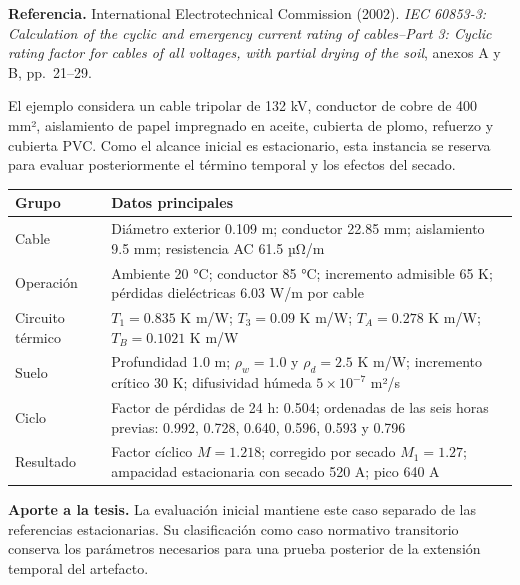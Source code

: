 \documentclass[11pt,a4paper,oneside]{report}
\newcounter{none}
\begin{document}
\textbf{Referencia.} International Electrotechnical Commission (2002).
\emph{IEC 60853-3: Calculation of the cyclic and emergency current
rating of cables--Part 3: Cyclic rating factor for cables of all
voltages, with partial drying of the soil}, anexos A y B, pp.~21--29.

El ejemplo considera un cable tripolar de 132 kV, conductor de cobre de
400 mm², aislamiento de papel impregnado en aceite, cubierta de plomo,
refuerzo y cubierta PVC. Como el alcance inicial es estacionario, esta
instancia se reserva para evaluar posteriormente el término temporal y
los efectos del secado.

{\def\LTcaptype{none} %
\begin{longtable}[]{@{}
  >{\raggedright\arraybackslash}p{}
  >{\raggedright\arraybackslash}p{}@{}}
\toprule\noalign{}
\begin{minipage}[b]{\linewidth}\raggedright
Grupo
\end{minipage} & \begin{minipage}[b]{\linewidth}\raggedright
Datos principales
\end{minipage} \\
\midrule\noalign{}
\endhead
\bottomrule\noalign{}
\endlastfoot
Cable & Diámetro exterior 0.109 m; conductor 22.85 mm; aislamiento 9.5
mm; resistencia AC 61.5 µΩ/m \\
Operación & Ambiente 20 °C; conductor 85 °C; incremento admisible 65 K;
pérdidas dieléctricas 6.03 W/m por cable \\
Circuito térmico & \(T_1=0.835\) K m/W; \(T_3=0.09\) K m/W;
\(T_A=0.278\) K m/W; \(T_B=0.1021\) K m/W \\
Suelo & Profundidad 1.0 m; \(\rho_w=1.0\) y \(\rho_d=2.5\) K m/W;
incremento crítico 30 K; difusividad húmeda \(5\times10^{-7}\) m²/s \\
Ciclo & Factor de pérdidas de 24 h: 0.504; ordenadas de las seis horas
previas: 0.992, 0.728, 0.640, 0.596, 0.593 y 0.796 \\
Resultado & Factor cíclico \(M=1.218\); corregido por secado
\(M_1=1.27\); ampacidad estacionaria con secado 520 A; pico 640 A \\
\end{longtable}
}

\textbf{Aporte a la tesis.} La evaluación inicial mantiene este caso
separado de las referencias estacionarias. Su clasificación como caso
normativo transitorio conserva los parámetros necesarios para una prueba
posterior de la extensión temporal del artefacto.
\end{document}
